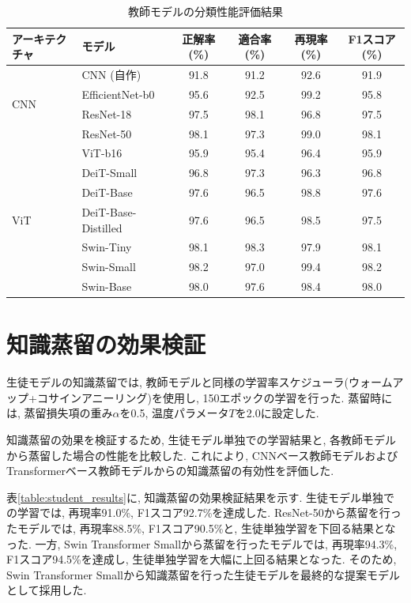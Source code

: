 \begin{table}[htbp]
\caption{教師モデルの分類性能評価結果}
\label{table:result_teacher_selection}
\begin{center}
\begin{tabular}{llcccc} \hline
アーキテクチャ & モデル & 正解率 (\%)& 適合率 (\%)& 再現率 (\%)& F1スコア (\%) \\ \hline
\multirow{4}{*}{CNN} & CNN (自作) & 91.8 & 91.2 & 92.6 & 91.9 \\
 & EfficientNet-b0 & 95.6 & 92.5 & 99.2 & 95.8 \\
 & ResNet-18 & 97.5 & 98.1 & 96.8 & 97.5 \\
 & ResNet-50 & 98.1 & 97.3 & 99.0 & 98.1 \\\hline
\multirow{7}{*}{ViT} & ViT-b16 & 95.9 & 95.4 & 96.4 & 95.9 \\
 & DeiT-Small & 96.8 & 97.3 & 96.3 & 96.8 \\
 & DeiT-Base & 97.6 & 96.5 & 98.8 & 97.6 \\
 & DeiT-Base-Distilled & 97.6 & 96.5 & 98.5 & 97.5 \\
 & Swin-Tiny & 98.1 & 98.3 & 97.9 & 98.1 \\
 & Swin-Small & 98.2 & 97.0 & 99.4 & 98.2 \\
 & Swin-Base & 98.0 & 97.6 & 98.4 & 98.0 \\\hline
\end{tabular}
\end{center}
\end{table}


\section{知識蒸留の効果検証}\label{result_kd_effect}
生徒モデルの知識蒸留では, 教師モデルと同様の学習率スケジューラ(ウォームアップ+コサインアニーリング)を使用し, 150エポックの学習を行った.
蒸留時には, 蒸留損失項の重み$\alpha$を0.5, 温度パラメータ$T$を2.0に設定した.

知識蒸留の効果を検証するため, 生徒モデル単独での学習結果と, 各教師モデルから蒸留した場合の性能を比較した.
これにより, CNNベース教師モデルおよびTransformerベース教師モデルからの知識蒸留の有効性を評価した.

表\ref{table:student_results}に, 知識蒸留の効果検証結果を示す. 
生徒モデル単独での学習では, 再現率91.0\%, F1スコア92.7\%を達成した. 
ResNet-50から蒸留を行ったモデルでは, 再現率88.5\%, F1スコア90.5\%と, 生徒単独学習を下回る結果となった. 
一方, Swin Transformer Smallから蒸留を行ったモデルでは, 再現率94.3\%, F1スコア94.5\%を達成し, 生徒単独学習を大幅に上回る結果となった. 
そのため, Swin Transformer Smallから知識蒸留を行った生徒モデルを最終的な提案モデルとして採用した.


